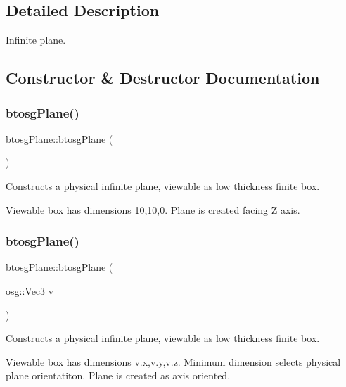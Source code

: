 \subsection{Detailed Description}
Infinite plane. 

\subsection{Constructor \& Destructor Documentation}
\mbox{\label{classbtosgPlane_a363737cea03a886470a1a46003706268}} 
\subsubsection{\texorpdfstring{btosg\+Plane()}{btosgPlane()}\hspace{0.1cm}{\footnotesize\ttfamily [1/3]}}
{\footnotesize\ttfamily btosg\+Plane\+::btosg\+Plane (\begin{DoxyParamCaption}{ }\end{DoxyParamCaption})\hspace{0.3cm}{\ttfamily [inline]}}

Constructs a physical infinite plane, viewable as low thickness finite box.

Viewable box has dimensions 10,10,0. Plane is created facing Z axis. \mbox{\label{classbtosgPlane_a4bc8b74d62426eb5fa66355b71569db2}} 
\subsubsection{\texorpdfstring{btosg\+Plane()}{btosgPlane()}\hspace{0.1cm}{\footnotesize\ttfamily [2/3]}}
{\footnotesize\ttfamily btosg\+Plane\+::btosg\+Plane (\begin{DoxyParamCaption}\item[{osg\+::\+Vec3}]{v }\end{DoxyParamCaption})\hspace{0.3cm}{\ttfamily [inline]}}

Constructs a physical infinite plane, viewable as low thickness finite box.

Viewable box has dimensions v.\+x,v.\+y,v.\+z. Minimum dimension selects physical plane orientatiton. Plane is created as axis oriented. \mbox{\label{classbtosgPlane_a295ebe4cb55a2786764c7840d10895f4}} 
